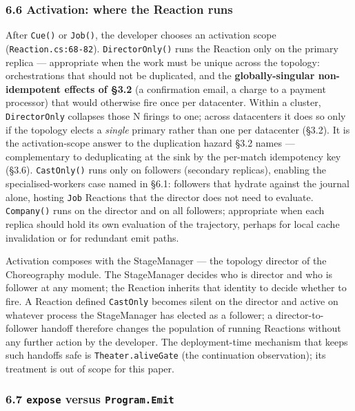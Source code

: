 \documentclass[
]{article}
\let\origtexttt\texttt%
\renewcommand{\texttt}[1]{\origtexttt{\seqsplit{#1}}}%
\let\texttt\origtexttt%
\begin{document}
\subsubsection{6.6 Activation: where the Reaction
runs}\label{activation-where-the-reaction-runs}

After \texttt{Cue()} or \texttt{Job()}, the developer chooses an
activation scope (\texttt{Reaction.cs:68-82}). \texttt{DirectorOnly()}
runs the Reaction only on the primary replica --- appropriate when the
work must be unique across the topology: orchestrations that should not
be duplicated, and the \textbf{globally-singular non-idempotent effects
of §3.2} (a confirmation email, a charge to a payment processor) that
would otherwise fire once per datacenter. Within a cluster,
\texttt{DirectorOnly} collapses those N firings to one; across
datacenters it does so only if the topology elects a \emph{single}
primary rather than one per datacenter (§3.2). It is the
activation-scope answer to the duplication hazard §3.2 names ---
complementary to deduplicating at the sink by the per-match idempotency
key (§3.6). \texttt{CastOnly()} runs only on followers (secondary
replicas), enabling the specialised-workers case named in §6.1:
followers that hydrate against the journal alone, hosting \texttt{Job}
Reactions that the director does not need to evaluate.
\texttt{Company()} runs on the director and on all followers;
appropriate when each replica should hold its own evaluation of the
trajectory, perhaps for local cache invalidation or for redundant emit
paths.

Activation composes with the StageManager --- the topology director of
the Choreography module. The StageManager decides who is director and
who is follower at any moment; the Reaction inherits that identity to
decide whether to fire. A Reaction defined \texttt{CastOnly} becomes
silent on the director and active on whatever process the StageManager
has elected as a follower; a director-to-follower handoff therefore
changes the population of running Reactions without any further action
by the developer. The deployment-time mechanism that keeps such handoffs
safe is \texttt{Theater.aliveGate} (the continuation observation); its
treatment is out of scope for this paper.

\subsubsection{\texorpdfstring{6.7 \texttt{expose} versus
\texttt{Program.Emit}}{6.7 expose versus Program.Emit}}\label{expose-versus-program.emit}
\end{document}
